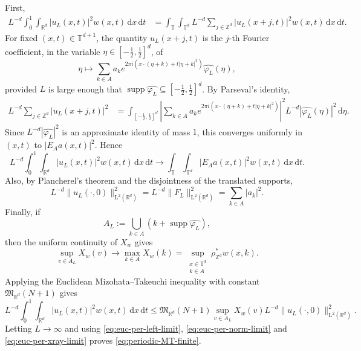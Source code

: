 \documentclass[10pt,a4paper]{amsart}
\numberwithin{equation}{section}
\newcommand{\supp}{\operatorname{supp}}
\newcommand{\dd}{\,\mathrm{d}}
\renewcommand{\leq}{\leqslant}
\begin{document}
First,
\begin{align*}
L^{-d}\int_0^1\int_{\mathbb{R}^d}|u_L(x,t)|^2w(x,t)\dd x\dd t
&=\int_{\mathbb{T}}\int_{\mathbb{T}^d}L^{-d}\sum_{j\in\mathbb{Z}^d}|u_L(x+j,t)|^2w(x,t)\dd x\dd t.
\end{align*}
For fixed $(x,t)\in\mathbb{T}^{d+1}$, the quantity $u_L(x+j,t)$ is the $j$-th Fourier coefficient, in the variable $\eta\in[-\tfrac12,\tfrac12]^d$, of
\[ \eta\mapsto \sum_{k\in A}a_k e^{2\pi i(x\cdot(\eta+k)+t|\eta+k|^2)}\widehat{\varphi_L}(\eta), \]
provided $L$ is large enough that $\supp\widehat{\varphi_L}\subseteq[-\tfrac12,\tfrac12]^d$. By Parseval's identity,
\begin{align*}
L^{-d}\sum_{j\in\mathbb{Z}^d}|u_L(x+j,t)|^2
&=\int_{[-\tfrac12,\tfrac12]^d}\left|\sum_{k\in A}a_k e^{2\pi i(x\cdot(\eta+k)+t|\eta+k|^2)}\right|^2L^{-d}|\widehat{\varphi_L}(\eta)|^2\dd\eta.
\end{align*}
Since $L^{-d}|\widehat{\varphi_L}|^2$ is an approximate identity of mass $1$, this converges uniformly in $(x,t)$ to $|E_Aa(x,t)|^2$. Hence
\begin{equation}\label{eq:euc-per-left-limit}
L^{-d}\int_0^1\int_{\mathbb{R}^d}|u_L(x,t)|^2w(x,t)\dd x\dd t
\longrightarrow
\int_{\mathbb{T}}\int_{\mathbb{T}^d}|E_Aa(x,t)|^2w(x,t)\dd x\dd t.
\end{equation}
Also, by Plancherel's theorem and the disjointness of the translated supports,
\begin{equation}\label{eq:euc-per-norm-limit}
L^{-d}\|u_L(\cdot,0)\|_{\mathrm{L}^2(\mathbb{R}^d)}^2
=L^{-d}\|F_L\|_{\mathrm{L}^2(\mathbb{R}^d)}^2
=\sum_{k\in A}|a_k|^2.
\end{equation}
Finally, if
\[ A_L:=\bigcup_{k\in A}(k+\supp\widehat{\varphi_L}), \]
then the uniform continuity of $X_w$ gives
\begin{equation}\label{eq:euc-per-xray-limit}
\sup_{v\in A_L}X_w(v)
\longrightarrow \max_{k\in A}X_w(k)
=\sup_{\substack{x\in\mathbb{T}^d\\ k\in A}}\rho^{\ast}_{\mathbb{Z}^d}w(x,k).
\end{equation}
Applying the Euclidean Mizohata--Takeuchi inequality with constant $\mathfrak{M}_{\mathbb{R}^d}(N+1)$ gives
\[ L^{-d}\int_0^1\int_{\mathbb{R}^d}|u_L(x,t)|^2w(x,t)\dd x\dd t
\leq \mathfrak{M}_{\mathbb{R}^d}(N+1)\sup_{v\in A_L}X_w(v)
L^{-d}\|u_L(\cdot,0)\|_{\mathrm{L}^2(\mathbb{R}^d)}^2. \]
Letting $L\to\infty$ and using \eqref{eq:euc-per-left-limit}, \eqref{eq:euc-per-norm-limit} and \eqref{eq:euc-per-xray-limit} proves \eqref{eq:periodic-MT-finite}.
\end{document}
